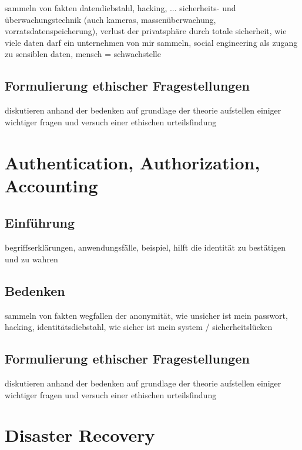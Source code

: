 \documentclass[letterpaper, 12pt]{article}
\let\tempsection\section
\renewcommand\section[1]{\vspace{-0.3cm}\tempsection{#1}\vspace{-0.3cm}}
\let\tempsubsection\subsection
\renewcommand\subsection[1]{\vspace{0cm}\tempsubsection{#1}\vspace{0cm}}
\begin{document}
sammeln von fakten \newline
datendiebstahl, hacking, ... sicherheits- und überwachungstechnik (auch kameras, massenüberwachung, vorratsdatenspeicherung), verlust der privatsphäre durch totale sicherheit, wie viele daten darf ein unternehmen von mir sammeln, social engineering als zugang zu sensiblen daten, mensch = schwachstelle

\subsection{Formulierung ethischer Fragestellungen}

diskutieren anhand der bedenken auf grundlage der theorie \newline
aufstellen einiger wichtiger fragen und versuch einer ethischen urteilsfindung

\clearpage

\section{Authentication, Authorization, Accounting}

\subsection{Einführung}

begriffserklärungen, anwendungsfälle, beispiel, hilft die identität zu bestätigen und zu wahren

\subsection{Bedenken}

sammeln von fakten \newline
wegfallen der anonymität, wie unsicher ist mein passwort, hacking, identitätsdiebstahl, wie sicher ist mein system / sicherheitslücken

\subsection{Formulierung ethischer Fragestellungen}

diskutieren anhand der bedenken auf grundlage der theorie \newline
aufstellen einiger wichtiger fragen und versuch einer ethischen urteilsfindung

\clearpage

\section{Disaster Recovery}
\end{document}
